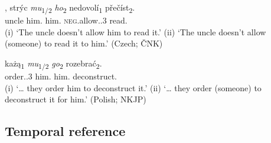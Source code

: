 \documentclass[output=paper,colorlinks,citecolor=brown]{langscibook}
\begin{document}
\ea\label{kul:ex:slovene}
\z
\z

\ea\label{kul:ex:stryc-mu}
\gll [...], strýc \textit{mu}\textsubscript{1/2} \textit{ho}\textsubscript{2} nedovolí\textsubscript{1} přečíst\textsubscript{2}.\\
{} uncle him.{\DAT} him.{\ACC} \textsc{neg}.allow.{\PRS.3\SG} read.{\INF} \\
\glt (i) `The uncle doesn’t allow him to read it.’ 
\glt (ii) `The uncle doesn’t allow (someone) to read it to him.’ \hfill (Czech; ČNK)
\z

\ea\label{kul:ex:kaza-mu}
\gll […] każą\textsubscript{1} \textit{mu}\textsubscript{1/2} \textit{go}\textsubscript{2} rozebrać\textsubscript{2}.\\
{} order.{\PRS.3\PL} him.{\DAT} him.{\ACC} deconstruct.{\INF} \\
\glt (i) `… they order him to deconstruct it.’ 
\glt (ii) `… they order (someone) to deconstruct it for him.’ \hfill (Polish; NKJP)
\z

\subsection{Temporal reference}\label{kul:sec:temp-reference}
\end{document}
